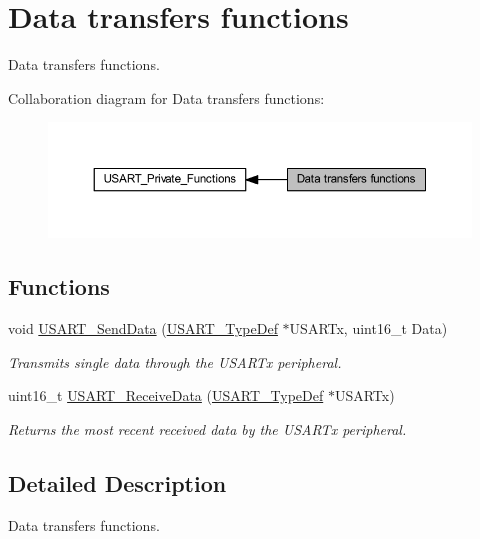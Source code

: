 \hypertarget{group___u_s_a_r_t___group2}{}\section{Data transfers functions}
\label{group___u_s_a_r_t___group2}


Data transfers functions.  


Collaboration diagram for Data transfers functions\+:\nopagebreak
\begin{figure}[H]
\begin{center}
\leavevmode
\includegraphics[width=350pt]{group___u_s_a_r_t___group2}
\end{center}
\end{figure}
\subsection*{Functions}
\begin{DoxyCompactItemize}
\item 
void \hyperlink{group___u_s_a_r_t___group2_ga0b43d42da9540f446d494bf69823c6fb}{U\+S\+A\+R\+T\+\_\+\+Send\+Data} (\hyperlink{struct_u_s_a_r_t___type_def}{U\+S\+A\+R\+T\+\_\+\+Type\+Def} $\ast$U\+S\+A\+R\+Tx, uint16\+\_\+t Data)
\begin{DoxyCompactList}\small\item\em Transmits single data through the U\+S\+A\+R\+Tx peripheral. \end{DoxyCompactList}\item 
uint16\+\_\+t \hyperlink{group___u_s_a_r_t___group2_gac67a91845b0b1d54d31bdfb1c5e9867c}{U\+S\+A\+R\+T\+\_\+\+Receive\+Data} (\hyperlink{struct_u_s_a_r_t___type_def}{U\+S\+A\+R\+T\+\_\+\+Type\+Def} $\ast$U\+S\+A\+R\+Tx)
\begin{DoxyCompactList}\small\item\em Returns the most recent received data by the U\+S\+A\+R\+Tx peripheral. \end{DoxyCompactList}\end{DoxyCompactItemize}


\subsection{Detailed Description}
Data transfers functions. 


